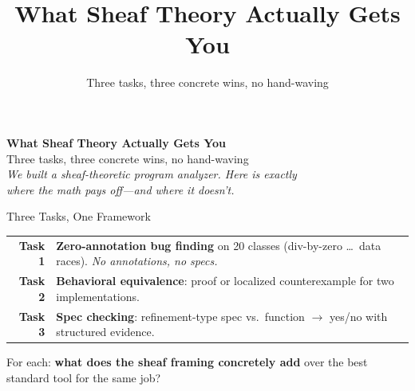 \documentclass[aspectratio=169,10pt]{beamer}
\title{What Sheaf Theory Actually Gets You}
\subtitle{Three tasks, three concrete wins, no hand-waving}
\author{}
\date{}
\begin{document}
\begin{frame}[plain]
\vspace{1.5cm}
\begin{center}
{\Large\textbf{What Sheaf Theory Actually Gets You}}\\[0.3em]
{\normalsize Three tasks, three concrete wins, no hand-waving}\\[1em]
{\small\textit{We built a sheaf-theoretic program analyzer.
Here is exactly\\where the math pays off---and where it doesn't.}}
\end{center}
\end{frame}

\begin{frame}{Three Tasks, One Framework}
\renewcommand{\arraystretch}{1.3}
\begin{tabular}{@{}rp{10cm}@{}}
\textbf{Task 1} & \textbf{Zero-annotation bug finding} on 20 classes
                   (div-by-zero \ldots\ data races).
                   \emph{No annotations, no specs.} \\
\textbf{Task 2} & \textbf{Behavioral equivalence}: proof or
                   localized counterexample for two implementations. \\
\textbf{Task 3} & \textbf{Spec checking}: refinement-type spec vs.\ function
                   $\to$ yes/no with structured evidence. \\
\end{tabular}

\vspace{0.6em}
For each: \textbf{what does the sheaf framing concretely add}
over the best standard tool for the same job?
\end{frame}
\end{document}
